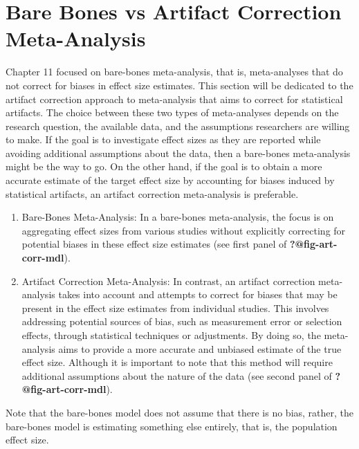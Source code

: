 \documentclass[
  letterpaper,
  DIV=11,
  numbers=noendperiod]{scrreprt}
\begin{document}
\hypertarget{bare-bones-vs-artifact-correction-meta-analysis}{%
\section{Bare Bones vs Artifact Correction
Meta-Analysis}\label{bare-bones-vs-artifact-correction-meta-analysis}}

Chapter 11 focused on bare-bones meta-analysis, that is, meta-analyses
that do not correct for biases in effect size estimates. This section
will be dedicated to the artifact correction approach to meta-analysis
that aims to correct for statistical artifacts. The choice between these
two types of meta-analyses depends on the research question, the
available data, and the assumptions researchers are willing to make. If
the goal is to investigate effect sizes as they are reported while
avoiding additional assumptions about the data, then a bare-bones
meta-analysis might be the way to go. On the other hand, if the goal is
to obtain a more accurate estimate of the target effect size by
accounting for biases induced by statistical artifacts, an artifact
correction meta-analysis is preferable.

\begin{enumerate}
\def\labelenumi{\arabic{enumi}.}
\item
  Bare-Bones Meta-Analysis: In a bare-bones meta-analysis, the focus is
  on aggregating effect sizes from various studies without explicitly
  correcting for potential biases in these effect size estimates (see
  first panel of \textbf{?@fig-art-corr-mdl}).
\item
  Artifact Correction Meta-Analysis: In contrast, an artifact correction
  meta-analysis takes into account and attempts to correct for biases
  that may be present in the effect size estimates from individual
  studies. This involves addressing potential sources of bias, such as
  measurement error or selection effects, through statistical techniques
  or adjustments. By doing so, the meta-analysis aims to provide a more
  accurate and unbiased estimate of the true effect size. Although it is
  important to note that this method will require additional assumptions
  about the nature of the data (see second panel of
  \textbf{?@fig-art-corr-mdl}).
\end{enumerate}

Note that the bare-bones model does not assume that there is no bias,
rather, the bare-bones model is estimating something else entirely, that
is, the population effect size.
\end{document}

